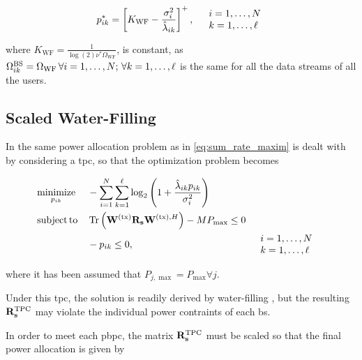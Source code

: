 \begin{equation} \label{eq:standard_wf}
    p_{ik}^\ast = \left[K_{\text{WF}} -
        \frac{\sigma_i^2}{\hat{\lambda}_{ik}}\right]^+, \quad
        \begin{array}{l}
            i = 1, \ldots, N\\
            k = 1, \ldots, \ell
        \end{array}
\end{equation}

\noindent
where $K_{\text{WF}} = \frac{1}{\log\left(2\right)\nu^\ast\Omega_{\text{WF}}}$,
is constant, as $\Omega_{ik}^{\text{BS}} = \Omega_{\text{WF}}\,\forall i = 1, \ldots, N;\, 
\forall k = 1, \ldots, \ell$ is the same for all the data streams of all the
users.

\subsection{Scaled Water-Filling}\label{ssec:scaled_wf}

In \cite{zhang09} the same power allocation problem as in
\eqref{eq:sum_rate_maxim} is dealt with by considering a \gls{tpc}, so that the
optimization problem becomes

\begin{equation} \label{eq:optim_scaled_wf}
\begin{aligned}
	&\operatorname*{minimize}\limits_{p_{ik}} &&-\sum\limits_{i = 1}^N
	\sum\limits_{k = 1}^\ell \log_2\left( 1 +
	\frac{\hat{\lambda}_{ik} p_{ik}}{\sigma_i^2} \right)\\
    &\operatorname*{subject\,to} && \operatorname*{Tr}\left( \mathbf{W}^{(\text{tx})} \mathbf{R}_{\mathbf{s}} \mathbf{W}^{(\text{tx}),H} \right) - M P_{\max} \leq 0\\
    & &&-p_{ik} \leq 0, &&
	\begin{array}{l}
	i = 1, \ldots, N\\
	k = 1, \ldots, \ell
	\end{array}
\end{aligned}
\end{equation}

\noindent
where it has been assumed that $P_{j,\max} = P_{\max} \forall j$.

Under this \gls{tpc}, the solution is readily derived by water-filling
\cite{cioffi_notes}, but the resulting $\mathbf{R}_{\mathbf{s}}^{\text{TPC}}$ may violate
the individual power contraints of each \gls{bs}.

In order to meet each \gls{pbpc}, the matrix $\mathbf{R}_{\mathbf{s}}^{\text{TPC}}$ must be
scaled so that the final power allocation is given by

